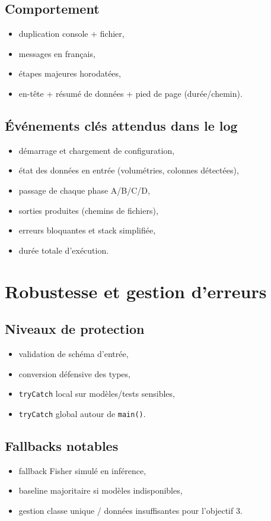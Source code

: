 \documentclass[11pt,a4paper]{article}
\begin{document}
\subsection{Comportement}
\begin{itemize}[leftmargin=1.2cm]
  \item duplication console + fichier,
  \item messages en français,
  \item étapes majeures horodatées,
  \item en-tête + résumé de données + pied de page (durée/chemin).
\end{itemize}

\subsection{Événements clés attendus dans le log}
\begin{itemize}[leftmargin=1.2cm]
  \item démarrage et chargement de configuration,
  \item état des données en entrée (volumétries, colonnes détectées),
  \item passage de chaque phase A/B/C/D,
  \item sorties produites (chemins de fichiers),
  \item erreurs bloquantes et stack simplifiée,
  \item durée totale d'exécution.
\end{itemize}

\section{Robustesse et gestion d'erreurs}
\subsection{Niveaux de protection}
\begin{itemize}[leftmargin=1.2cm]
  \item validation de schéma d'entrée,
  \item conversion défensive des types,
  \item \texttt{tryCatch} local sur modèles/tests sensibles,
  \item \texttt{tryCatch} global autour de \texttt{main()}.
\end{itemize}

\subsection{Fallbacks notables}
\begin{itemize}[leftmargin=1.2cm]
  \item fallback Fisher simulé en inférence,
  \item baseline majoritaire si modèles indisponibles,
  \item gestion classe unique / données insuffisantes pour l'objectif 3.
\end{itemize}
\end{document}

